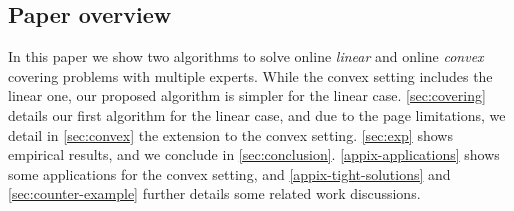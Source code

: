 \subsection{Paper overview}

In this paper we show two algorithms to solve online \emph{linear} and online \emph{convex} covering problems with multiple experts. While the convex setting includes the linear one, our proposed algorithm is simpler for the linear case. \cref{sec:covering} details our first algorithm for the linear case, and due to the page limitations, we detail in \cref{sec:convex} the extension to the convex setting. \cref{sec:exp} shows empirical results, and we conclude in \cref{sec:conclusion}. \cref{appix-applications} shows some applications for the convex setting, and \cref{appix-tight-solutions} and \cref{sec:counter-example} further details some
related work discussions.
